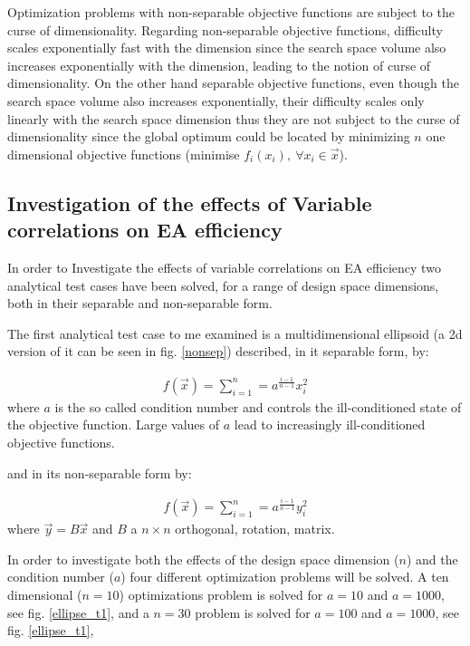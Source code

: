 Optimization problems with non-separable objective functions are subject to the curse of dimensionality. Regarding non-separable objective functions, difficulty scales exponentially fast with the dimension since the search space volume also increases exponentially with the dimension, leading to the notion of curse of dimensionality. On the other hand separable objective functions, even though the search space volume also increases exponentially, their difficulty scales only linearly with the search space dimension thus they are not subject to the curse of dimensionality since the global optimum could be located by minimizing $n$ one dimensional objective functions (minimise $f_i(x_i),~ \forall x_i \in \vec{x}$).
 
\subsection{Investigation of the effects of Variable correlations on EA efficiency}

In order to Investigate the effects of variable correlations on EA efficiency two analytical test cases have been solved, for a range of design space dimensions, both in their separable and non-separable form.

The first analytical test case to me examined is a multidimensional ellipsoid (a 2d version of it can be seen in fig. \ref{nonsep}) described, in it separable form, by:   


\begin{eqnarray}
   f(\vec{x})=\sum^{n}_{i=1}=a^{\frac{i-1}{n-1}}x_i^2
   \label{ellipse} 
\end{eqnarray}
where $a$ is the so called condition number and controls the ill-conditioned state of the objective function. Large values of $a$ lead to increasingly ill-conditioned objective functions.

and in its non-separable form by:

\begin{eqnarray}
   f(\vec{x})=\sum^{n}_{i=1}=a^{\frac{i-1}{n-1}}y_i^2
   \label{ellipse} 
\end{eqnarray}
where $\vec{y}=B\vec{x}$ and $B$ a $n\times n$ orthogonal, rotation, matrix.

In order to investigate both the effects of the design space dimension ($n$) and the condition number ($a$) four different optimization problems will be solved. A ten dimensional ($n=10$) optimizations problem is solved for $a=10$ and $a=1000$, see fig. \ref{ellipse_t1}, and a $n=30$ problem is solved for $a=100$ and $a=1000$, see fig. \ref{ellipse_t1}, 


